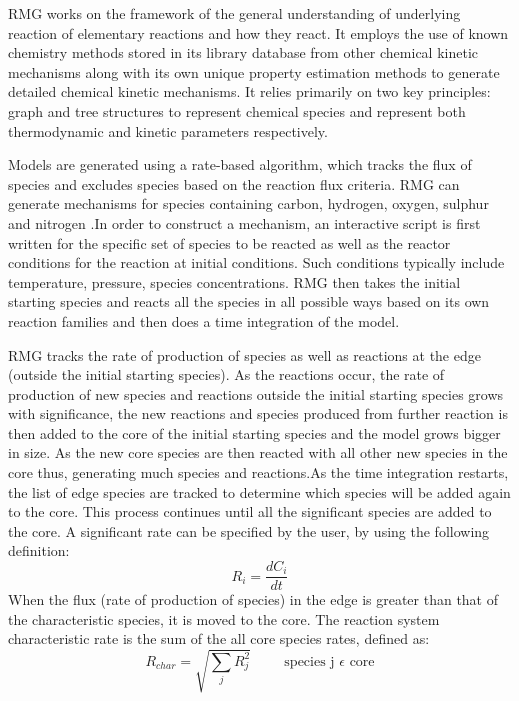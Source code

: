  RMG works on the framework of the general understanding of underlying reaction of elementary reactions and how they react. It employs the use of known chemistry methods stored in its library database from other chemical kinetic mechanisms along with its own unique property estimation methods to generate detailed chemical kinetic mechanisms. It relies primarily on two key principles: graph and tree structures to represent chemical species and represent both thermodynamic and kinetic parameters respectively. 
 
 Models are generated using a rate-based algorithm, which tracks the flux of species and excludes species based on the reaction flux criteria. RMG can generate mechanisms for species containing carbon, hydrogen, oxygen, sulphur and nitrogen .In order to construct a mechanism, an interactive script is first written for the specific set of species to be reacted as well as the reactor conditions for the reaction at initial conditions. Such conditions typically include temperature, pressure, species concentrations. RMG then takes the initial starting species and reacts all the species in all possible ways based on its own reaction families and then does a time integration of the model. 
 
 RMG tracks the rate of production of species as well as reactions at the edge (outside the initial starting species). As the reactions occur, the rate of production of new species and reactions outside the initial starting species grows with significance, the new reactions and species produced from further reaction is then added to the core of the initial starting species and the model grows bigger in size. As the new core species are then reacted with all other new species in the core thus, generating much species and reactions.As the time integration restarts, the list of edge species are tracked to determine which species will be added again to the core. This process continues until all the significant species are added to the core. A significant rate can be specified by the user, by using the following definition: 
 \begin{equation}
     R_i=\frac{dC_i}{dt}
 \end{equation}
 When the flux (rate of production of species) in the edge is greater than that of the characteristic species, it is moved to the core. The reaction system characteristic rate is the sum of the all core species rates, defined as:
 \begin{equation}
     R_{char}=\sqrt{\sum_j {R_{j}^2}} \hspace{1cm} \text{species j $\epsilon$ core}
 \end{equation}

